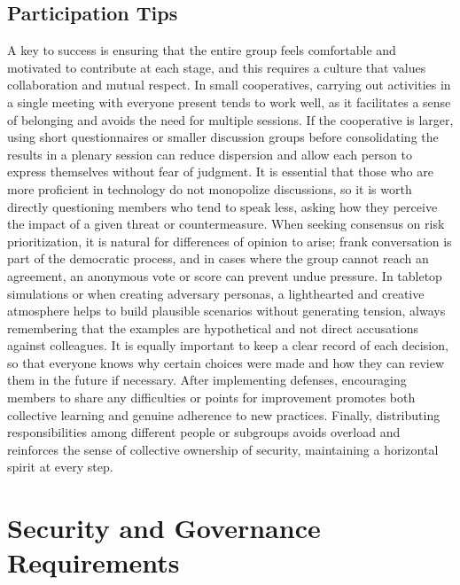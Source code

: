 \subsection{Participation Tips}
\label{subsec:participation_tips}

A key to success is ensuring that the entire group feels comfortable and
motivated to contribute at each stage, and this requires a culture that values
collaboration and mutual respect. In small cooperatives, carrying out
activities in a single meeting with everyone present tends to work well, as it
facilitates a sense of belonging and avoids the need for multiple sessions. If
the cooperative is larger, using short questionnaires or smaller discussion
groups before consolidating the results in a plenary session can reduce
dispersion and allow each person to express themselves without fear of judgment.
It is essential that those who are more proficient in technology do not
monopolize discussions, so it is worth directly questioning members who tend to
speak less, asking how they perceive the impact of a given threat or
countermeasure. When seeking consensus on risk prioritization, it is natural for
differences of opinion to arise; frank conversation is part of the democratic
process, and in cases where the group cannot reach an agreement, an anonymous
vote or score can prevent undue pressure. In tabletop simulations or when
creating adversary personas, a lighthearted and creative atmosphere helps to
build plausible scenarios without generating tension, always remembering that
the examples are hypothetical and not direct accusations against colleagues. It
is equally important to keep a clear record of each decision, so that everyone
knows why certain choices were made and how they can review them in the future
if necessary. After implementing defenses, encouraging members to share any
difficulties or points for improvement promotes both collective learning and
genuine adherence to new practices. Finally, distributing responsibilities among
different people or subgroups avoids overload and reinforces the sense of
collective ownership of security, maintaining a horizontal spirit at every step.

\section{Security and Governance Requirements}
\label{sec:security_governance_requirements}

